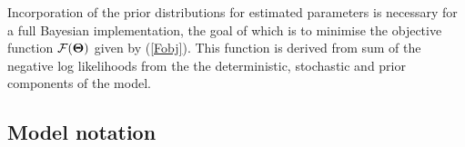 \documentclass[11pt]{book}
\newcommand{\Fobj}{\mathcal{F}}%
\def\bfTh{{\bf \Theta}}%
\newcommand{\comment}[1]{}                    %
\def\bfTh{{\bf \Theta}}%
\newcommand{\eref}[1]{(\ref{#1})}
\begin{document}
Incorporation of the prior distributions for estimated parameters is necessary for a full Bayesian implementation, the goal of which is to minimise the objective function $\Fobj(\bfTh)$ given by \eref{Fobj}. 
This function is derived from sum of the negative log likelihoods from the the deterministic, stochastic and prior components of the model.


\subsection{Model notation}

\setlength\tabcolsep{0pt}


\comment{
NA
}
\end{document}
